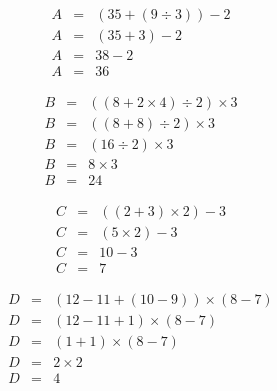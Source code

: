 \begin{multicols}{2}
	\begin{eqnarray*}
		A &=& (35 + (9 \div 3)) - 2\\
		A &=& (35 + 3) - 2\\
		A &=& 38 - 2 \\
		A &=& 36
	\end{eqnarray*}
	
	\begin{eqnarray*}
		B &=& ((8 + 2 \times 4) \div 2) \times 3 \\
		B &=& ((8 + 8) \div 2) \times 3 \\
		B &=& (16 \div 2) \times 3 \\
		B &=& 8 \times 3 \\
		B &=& 24 
	\end{eqnarray*}
	
	\begin{eqnarray*}
		C &=& ((2+3)\times 2) - 3 \\
		C &=& (5\times 2) - 3 \\
		C &=& 10 - 3 \\
		C &=& 7
	\end{eqnarray*}
	
	\begin{eqnarray*}
		D &=& (12 - 11 + (10 - 9)) \times (8-7) \\
		D &=& (12 - 11 + 1) \times (8-7) \\
		D &=& (1 + 1) \times (8-7) \\
		D &=& 2 \times 2 \\
		D &=& 4
	\end{eqnarray*}
\end{multicols}

